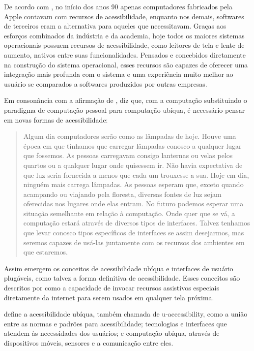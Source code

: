 \documentclass[twoside,english,brazilian]{UNISINOSartigo}
\begin{document}
De acordo com , no início dos anos 90 apenas computadores fabricados pela Apple contavam com recursos de acessibilidade, enquanto nos demais, softwares de terceiros eram a alternativa para aqueles que necessitavam. Graças aos esforços combinados da indústria e da academia, hoje todos os maiores sistemas operacionais possuem recursos de acessibilidade, como leitores de tela e lente de aumento, nativos entre suas funcionalidades. Pensados e concebidos diretamente na construção do sistema operacional, esses recursos são capazes de oferecer uma integração mais profunda com o sistema e uma experiência muito melhor ao usuário se comparados a softwares produzidos por outras empresas. 

Em consonância com a afirmação de ,  diz que, com a computação substituindo o paradigma de computação pessoal para computação ubíqua, é necessário pensar em novas formas de acessibilidade:

\begin{quote}
	Algum dia computadores serão como as lâmpadas de hoje. Houve uma época em que tínhamos que carregar lâmpadas conosco a qualquer lugar que fossemos. As pessoas carregavam consigo lanternas ou velas pelos quartos ou a qualquer lugar onde quisessem ir. Não havia expectativa de que luz seria fornecida a menos que cada um trouxesse a sua. Hoje em dia, ninguém mais carrega lâmpadas. As pessoas esperam que, exceto quando acampando ou viajando pela floresta, diversas fontes de luz sejam oferecidas nos lugares onde elas entram. No futuro podemos esperar uma situação semelhante em relação à computação. Onde quer que se vá, a computação estará através de diversos tipos de interfaces. Talvez tenhamos que levar conosco tipos específicos de interfaces se assim desejarmos, mas seremos capazes de usá-las juntamente com os recursos dos ambientes em que estaremos. \cite{vanderheiden2008ubiquitous}
\end{quote}

Assim emergem os conceitos de acessibilidade ubíqua e interfaces de usuário plugáveis, como talvez a forma definitiva de acessibilidade. Esses conceitos são descritos por  como a capacidade de invocar recursos assistivos especiais diretamente da internet para serem usados em qualquer tela próxima.

 define a acessibilidade ubíqua, também chamada de u-accessibility, como a união entre as normas e padrões para acessibilidade; tecnologias e interfaces que atendem às necessidades dos usuários; e computação ubíqua, através de dispositivos móveis, sensores e a comunicação entre eles.
\end{document}
